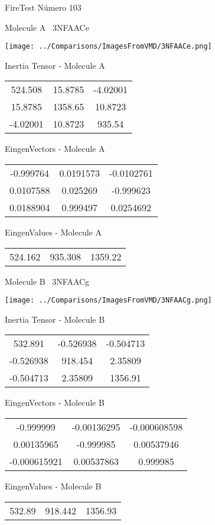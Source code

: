 \vtab[-3cm]
\begin{center}
{\large FireTest \tab Número 103}
\end{center}
\begin{multicols}{2}
\begin{center}

Molecule A \
3NFAACe

\texttt{[image: ../Comparisons/ImagesFromVMD/3NFAACe.png]}

Inertia Tensor - Molecule A \\
\begin{tabular}{|c c c|}
524.508	 & 	15.8785	 & 	-4.02001	 \\
15.8785	 & 	1358.65	 & 	10.8723	 \\
-4.02001	 & 	10.8723	 & 	935.54
\end{tabular}

\vtab
 EingenVectors - Molecule A     \\
\begin{tabular}{|c c c|}
-0.999764	 & 	0.0191573	 & 	-0.0102761	 \\
0.0107588	 & 	0.025269	 & 	-0.999623	 \\
0.0188904	 & 	0.999497	 & 	0.0254692
\end{tabular}

\vtab
 EingenValues - Molecule A     \\
\begin{tabular}{|c c c|}
524.162	 & 	935.308	 & 	1359.22	 \\
\end{tabular}
\columnbreak

Molecule B \
3NFAACg

\texttt{[image: ../Comparisons/ImagesFromVMD/3NFAACg.png]}

Inertia Tensor - Molecule B \\
\begin{tabular}{|c c c|}
532.891	 & 	-0.526938	 & 	-0.504713	 \\
-0.526938	 & 	918.454	 & 	2.35809	 \\
-0.504713	 & 	2.35809	 & 	1356.91
\end{tabular}

\vtab
 EingenVectors - Molecule B     \\
\begin{tabular}{|c c c|}
-0.999999	 & 	-0.00136295	 & 	-0.000608598	 \\
0.00135965	 & 	-0.999985	 & 	0.00537946	 \\
-0.000615921	 & 	0.00537863	 & 	0.999985
\end{tabular}

\vtab
 EingenValues - Molecule B     \\
\begin{tabular}{|c c c|}
532.89	 & 	918.442	 & 	1356.93	 \\
\end{tabular}

\end{center}
\end{multicols}


